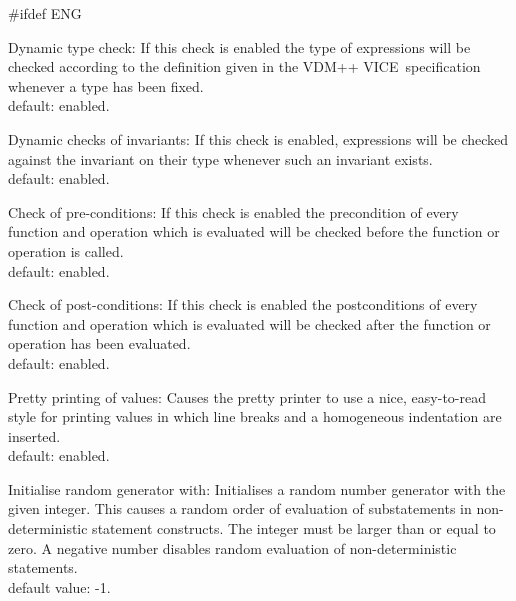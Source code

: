 \documentclass[\pformat,12pt]{article}
\newcommand{\vdmslpp}{VDM-SL}
\newcommand{\vdmslpp}{VDM++}
\renewcommand{\vdmslpp}{VDM++ VICE}
\begin{document}
\begin{list}{}{}
#ifdef ENG
\item[{\sf Dynamic type check}:] If this check is enabled the
  type of expressions will be checked according to the definition
  given in the \vdmslpp\ specification whenever a type has been
  fixed. \\
  default: enabled.
  
\item[{\sf Dynamic checks of invariants}:] If this check is
  enabled, expressions will be checked against the invariant on their
  type whenever such an invariant exists. \\
  default: enabled.
  
\item[{\sf Check of pre-conditions}:] If this check is enabled
  the precondition of every function and operation which is evaluated will be checked before
  the function or operation is called. \\
  default: enabled.
  
\item[{\sf Check of post-conditions}:]
  If this check is enabled 
  the postconditions of every function and operation which is
  evaluated will be checked after the function or operation has been
  evaluated. \\
  default: enabled.
  
\item[{\sf Pretty printing of values}:] Causes the pretty printer to
  use a nice, easy-to-read style for printing values in which line
  breaks and a homogeneous indentation are inserted. \\
  default: enabled.
  
\item[{\sf Initialise random generator with}:]
Initialises a random number generator with the given integer.  This
causes a random order of evaluation of substatements in
non-deterministic statement constructs.  The integer must be larger
than or equal to zero. A
negative number disables random evaluation of non-deterministic statements. \\
default value: -1.


\end{list}
\end{document}
